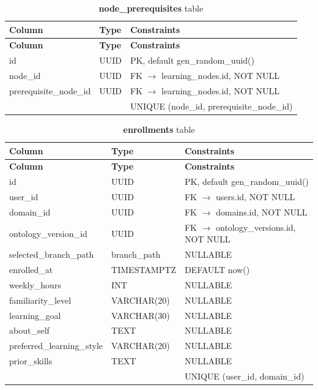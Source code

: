 \begin{longtable}{p{3cm}p{2.5cm}p{5cm}}
\caption{\textbf{node\_prerequisites} table}
\label{tab:ch04_node_prerequisites}\\
\toprule
\textbf{Column} & \textbf{Type} & \textbf{Constraints} \\
\midrule
\endfirsthead
\toprule
\textbf{Column} & \textbf{Type} & \textbf{Constraints} \\
\midrule
\endhead
id & UUID & PK, default gen\_random\_uuid() \\
node\_id & UUID & FK $\rightarrow$ learning\_nodes.id, NOT NULL \\
prerequisite\_node\_id & UUID & FK $\rightarrow$ learning\_nodes.id, NOT NULL \\
 &  & UNIQUE (node\_id, prerequisite\_node\_id) \\
\bottomrule
\end{longtable}

\begin{longtable}{p{3cm}p{2.5cm}p{5cm}}
\caption{\textbf{enrollments} table}
\label{tab:ch04_enrollments}\\
\toprule
\textbf{Column} & \textbf{Type} & \textbf{Constraints} \\
\midrule
\endfirsthead
\toprule
\textbf{Column} & \textbf{Type} & \textbf{Constraints} \\
\midrule
\endhead
id & UUID & PK, default gen\_random\_uuid() \\
user\_id & UUID & FK $\rightarrow$ users.id, NOT NULL \\
domain\_id & UUID & FK $\rightarrow$ domains.id, NOT NULL \\
ontology\_version\_id & UUID & FK $\rightarrow$ ontology\_versions.id, NOT NULL \\
selected\_branch\_path & branch\_path & NULLABLE \\
enrolled\_at & TIMESTAMPTZ & DEFAULT now() \\
weekly\_hours & INT & NULLABLE \\
familiarity\_level & VARCHAR(20) & NULLABLE \\
learning\_goal & VARCHAR(30) & NULLABLE \\
about\_self & TEXT & NULLABLE \\
preferred\_learning\_style & VARCHAR(20) & NULLABLE \\
prior\_skills & TEXT & NULLABLE \\
 &  & UNIQUE (user\_id, domain\_id) \\
\bottomrule
\end{longtable}

